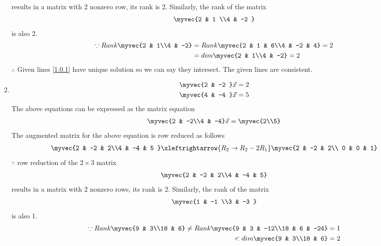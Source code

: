 \documentclass[journal,12pt,twocolumn]{IEEEtran}
\begin{document}
\begin{enumerate}
\begin{align}
\end{align}
%
results in a matrix with 2 nonzero row, its rank is 2. 
%
Similarly, the rank of the matrix 
\begin{align}
\myvec{2 & 1 \\4 & -2 } 
\end{align}
%
is also 2.
%
\begin{align}
\because Rank \myvec{2 & 1\\4 & -2} &= Rank\myvec{2 & 1 & 6\\4 & -2 & 4}=2\nonumber\\
&=dim\myvec{2 & 1\\4 & -2}=2
\end{align}
$\therefore$ Given lines \eqref{1.0.1} have unique solution so we can say they intersect. The given lines are consistent. 
\item
\begin{align}
\begin{split}
\myvec{2 & -2 }\vec{x}&=2
\\
\myvec{4 & -4 }\vec{x}&=5
\end{split}
\end{align}
The above equations can be expressed as the matrix equation
\begin{align}
\myvec{2 & -2\\4 & -4} \vec{x} = \myvec{2\\5}
\end{align}
%
The augmented matrix for the above equation is row reduced as follows
\begin{align}
\myvec{2 & -2 & 2\\4 & -4 & 5 } 
\xleftrightarrow{R_2 \rightarrow R_2-2R_1}
\myvec{2 & -2 & 2\\ 0 & 0 & 1}
\end{align}
%
$\because$ row reduction of the $2\times 3$ matrix
%
\begin{align}
\myvec{2 & -2 & 2\\4 & -4 & 5}
\end{align}
%
results in a matrix with 2 nonzero rows, its rank is 2. 
%
Similarly, the rank of the matrix 
\begin{align}
\myvec{1 & -1 \\3 & -3 } 
\end{align}
%
is also 1.
%
\begin{align}
\because Rank \myvec{9 & 3\\18 & 6} \ne Rank\myvec{9 & 3 & -12\\18 & 6 & -24}=1\nonumber\\<dim\myvec{9 & 3\\18 & 6}=2

\end{align}
\end{enumerate}
\end{document}
